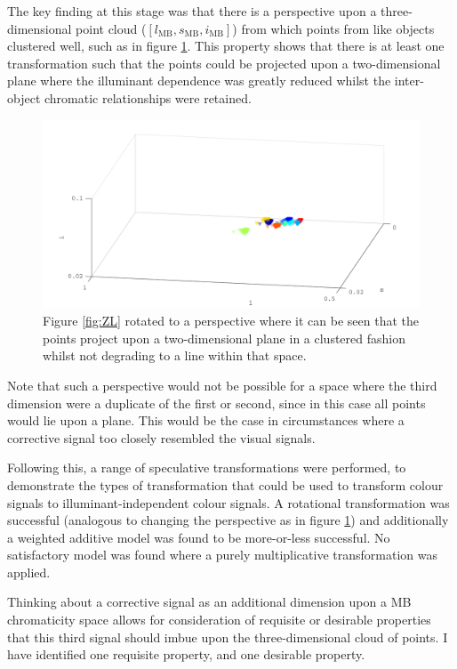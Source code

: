 The key finding at this stage was that there is a perspective upon a three-dimensional point cloud ($[l_{\text{MB}},s_{\text{MB}},i_{\text{MB}}]$) from which points from like objects clustered well, such as in figure \ref{fig:viewpoint}. This property shows that there is at least one transformation such that the points could be projected upon a two-dimensional plane where the illuminant dependence was greatly reduced whilst the inter-object chromatic relationships were retained. 

\begin{figure}[htbp]
 \includegraphics[max width=\textwidth]{figs/comp/melcomp_2_caller/viewpoint.pdf}
 \caption{Figure \ref{fig:ZL} rotated to a perspective where it can be seen that the points project upon a two-dimensional plane in a clustered fashion whilst not degrading to a line within that space.}
 \label{fig:viewpoint}
\end{figure} 

Note that such a perspective would not be possible for a space where the third dimension were a duplicate of the first or second, since in this case all points would lie upon a plane. This would be the case in circumstances where a corrective signal too closely resembled the visual signals.

Following this, a range of speculative transformations were performed, to demonstrate the types of transformation that could be used to transform colour signals to illuminant-independent colour signals. A rotational transformation was successful (analogous to changing the perspective as in figure \ref{fig:viewpoint}) and additionally a weighted additive model was found to be more-or-less successful. No satisfactory model was found where a purely multiplicative transformation was applied.

Thinking about a corrective signal as an additional dimension upon a \gls{MB} chromaticity space allows for consideration of requisite or desirable properties that this third signal should imbue upon the three-dimensional cloud of points. I have identified one requisite property, and one desirable property. 

